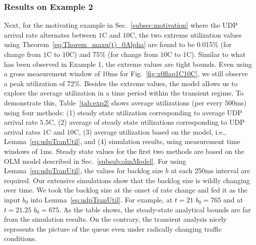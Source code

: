 \documentclass{IEEEtran}
\begin{document}
    \subsubsection{Results on Example 2}\label{subsubsec:example2}
Next, for the motivating example in Sec.~\ref{subsec:motivation} where the UDP arrival rate alternates between $1$C and $10$C, the two extreme utilization values using Theorem~\ref{eq:Thorem_maxu(t)_0Alpha}  are found to be 0.015\% (for change from $1$C to $10$C) and 75\% (for change from $10$C to $1$C). Similar to what has been observed in Example 1, the extreme values are tight bounds. Even using a gross measurement window of 10ms for Fig.~\ref{fig:x0flap1C10C}, we still observe a peak utilization of 72\%. Besides the extreme values, the model allows us to explore the average utilization in a time period within the transient regime. To demonstrate this, Table~\ref{tab:exp2} shows average utilizations (per every $500$ms) using four methods: (1) steady state utilization corresponding to average UDP arrival rate $5.5$C, (2) average of steady state utilizations corresponding to UDP arrival rates $1$C and $10$C, (3) average utilization based on the model, i.e.,  Lemma~\ref{eq:udpTranUtil}, and (4) simulation results, using measurement time windows of $1$ms. Steady state values for the first two methods are based on the OLM model described in Sec.~\ref{subsub:olmModel}. For using Lemma~\ref{eq:udpTranUtil}, the values for backlog size $b$ at each 250ms interval are required. Our extensive simulations show that the backlog size is wildly changing over time. We took the backlog size at the onset of rate change and fed it as the input $b_0$ into  Lemma~\ref{eq:udpTranUtil}. For example, at $t=21$ $b_{0}=765$ and at $t=21.25$  $b_0=675$.  As the table shows, the steady-state analytical bounds are far from the simulation results. On the contrary, the transient analysis  nicely represents the picture of the queue even under radically changing traffic conditions.
\end{document}
